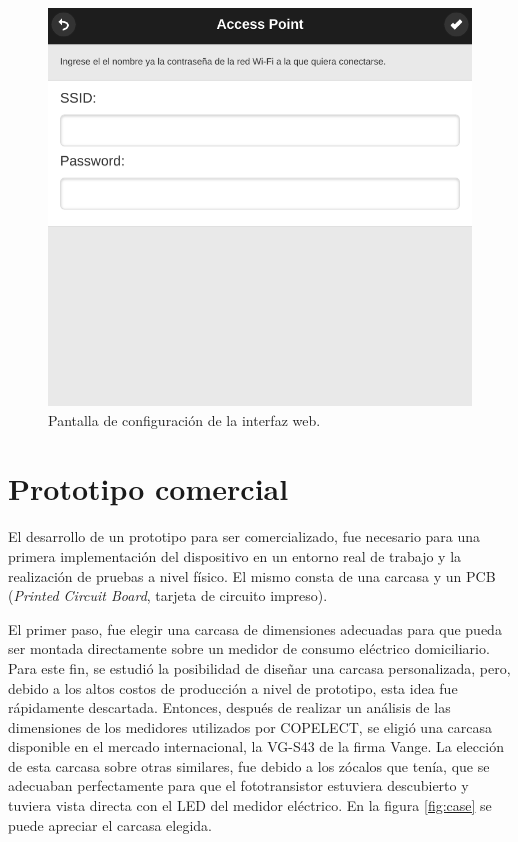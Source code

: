 \begin{figure}[h]
	\centering
	\includegraphics[scale=0.3]{./Figures/interface_conf.png}
	\caption{Pantalla de configuración de la interfaz web.}
	\label{fig:interfaceConf}
\end{figure}

\section{Prototipo comercial}

El desarrollo de un prototipo para ser comercializado, fue necesario para una primera implementación del dispositivo en un entorno real de trabajo y la realización de pruebas a nivel físico. El mismo consta de una carcasa y un PCB (\textit{Printed Circuit Board}, tarjeta de circuito impreso).

El primer paso, fue elegir una carcasa de dimensiones adecuadas para que pueda ser montada directamente sobre un medidor de consumo eléctrico domiciliario. Para este fin, se estudió la posibilidad de diseñar una carcasa personalizada, pero, debido a los altos costos de producción a nivel de prototipo, esta idea fue rápidamente descartada. Entonces, después de realizar un análisis de las dimensiones de los medidores utilizados por COPELECT, se eligió una carcasa disponible en el mercado internacional, la VG-S43 de la firma Vange. La elección de esta carcasa sobre otras similares, fue debido a los zócalos que tenía, que se adecuaban perfectamente para que el fototransistor estuviera descubierto y tuviera vista directa con el LED del medidor eléctrico. En la figura \ref{fig:case} se puede apreciar el carcasa elegida.

